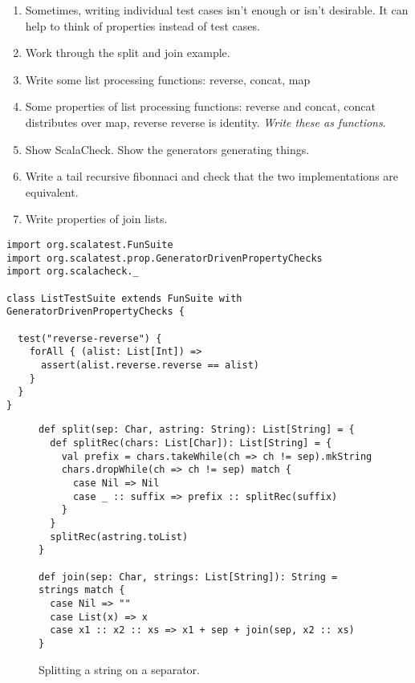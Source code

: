 \documentclass[9pt]{extbook}
\begin{document}
\begin{enumerate}

\item  Sometimes, writing individual test cases isn't enough or isn't desirable.
  It can help to think of properties instead of test cases.

\item Work through the split and join example. 

\item Write some list processing functions: reverse, concat, map

\item Some properties of list processing functions: reverse and concat,
  concat distributes over map, reverse reverse is identity. \emph{Write these
    as functions}.

\item Show ScalaCheck. Show the generators generating things.

\item Write a tail recursive fibonnaci and check that the two implementations
are equivalent.

\item Write properties of join lists.

\end{enumerate}

\begin{lstlisting}
import org.scalatest.FunSuite
import org.scalatest.prop.GeneratorDrivenPropertyChecks
import org.scalacheck._

class ListTestSuite extends FunSuite with GeneratorDrivenPropertyChecks {

  test("reverse-reverse") {
    forAll { (alist: List[Int]) =>
      assert(alist.reverse.reverse == alist)
    }
  }
}
\end{lstlisting}

\begin{figure}
\begin{lstlisting}
def split(sep: Char, astring: String): List[String] = {
  def splitRec(chars: List[Char]): List[String] = {
    val prefix = chars.takeWhile(ch => ch != sep).mkString
    chars.dropWhile(ch => ch != sep) match {
      case Nil => Nil
      case _ :: suffix => prefix :: splitRec(suffix)
    }
  }
  splitRec(astring.toList)
}

def join(sep: Char, strings: List[String]): String = strings match {
  case Nil => ""
  case List(x) => x
  case x1 :: x2 :: xs => x1 + sep + join(sep, x2 :: xs)
}
\end{lstlisting}
\caption{Splitting a string on a separator.}\label{split_buggy}
\end{figure}
\end{document}
